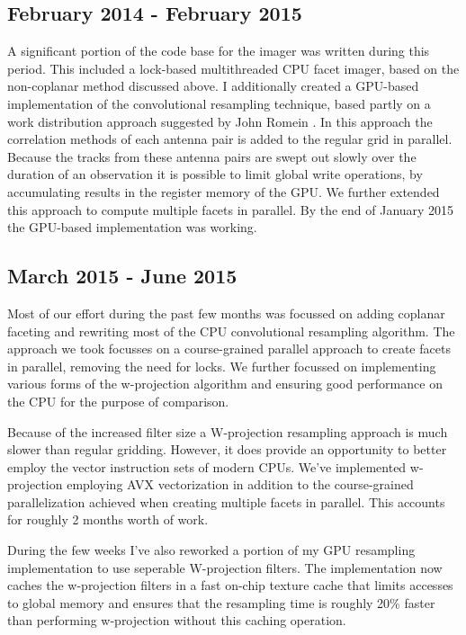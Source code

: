\documentclass[a4paper,10pt]{article}
\begin{document}
\subsection{February 2014 - February 2015}
A significant portion of the code base for the imager was written during this period. This included a lock-based multithreaded 
CPU facet imager, based on the non-coplanar method discussed above. I additionally created a GPU-based implementation of the
convolutional resampling technique, based partly on a work distribution approach suggested by John Romein \cite{romein2012efficient}.
In this approach the correlation methods of each antenna pair is added to the regular grid in parallel. Because the tracks from these
antenna pairs are swept out slowly over the duration of an observation it is possible to limit global write operations, by accumulating
results in the register memory of the GPU. We further extended this approach to compute multiple facets in parallel. By the end of January 2015
the GPU-based implementation was working.
\subsection{March 2015 - June 2015}
Most of our effort during the past few months was focussed on adding coplanar faceting and rewriting most of the CPU convolutional resampling algorithm.
The approach we took focusses on a course-grained parallel approach to create facets in parallel, removing the need for locks. We further focussed on implementing
various forms of the w-projection algorithm and ensuring good performance on the CPU for the purpose of comparison. 

Because of the increased filter size a W-projection resampling approach is much slower than regular gridding. However, it does provide an opportunity
to better employ the vector instruction sets of modern CPUs. We've implemented w-projection employing AVX vectorization in addition to the course-grained 
parallelization achieved when creating multiple facets in parallel. This accounts for roughly 2 months worth of work.

During the few weeks I've also reworked a portion of my GPU resampling implementation to use seperable W-projection filters. The implementation now
caches the w-projection filters in a fast on-chip texture cache that limits accesses to global memory and ensures that the resampling time is roughly 20\% faster than
performing w-projection without this caching operation.
\end{document}
